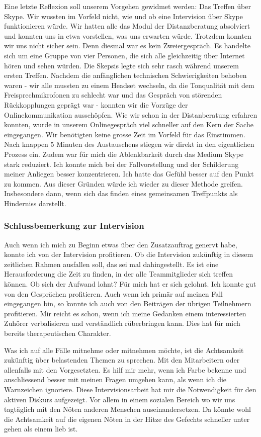 Eine letzte Reflexion soll unserem Vorgehen gewidmet werden: Das Treffen über Skype. Wir wussten im Vorfeld nicht, wie und ob eine Intervision über Skype funktionieren würde. Wir hatten alle das Modul der Distanzberatung absolviert und konnten uns in etwa vorstellen, was uns erwarten würde. Trotzdem konnten wir uns nicht sicher sein. Denn diesmal war es kein Zweiergespräch. Es handelte sich um eine Gruppe von vier Personen, die sich alle gleichzeitig über Internet hören und sehen würden. Die Skepsis legte sich sehr rasch während unserem ersten Treffen. Nachdem die anfänglichen technischen Schwierigkeiten behoben waren - wir alle mussten zu einem Headset wechseln, da die Tonqualität mit dem Freisprechmikrofonen zu schlecht war und das Gespräch von störenden Rückkopplungen geprägt war - konnten wir die Vorzüge der Onlinekommunikation ausschöpfen. Wie wir schon in der Distanberatung erfahren konnten, wurde in unserem Onlinegespräch viel schneller auf den Kern der Sache eingegangen. Wir benötigten keine grosse Zeit im Vorfeld für das Einstimmen. Nach knappen 5 Minuten des Austauschens stiegen wir direkt in den eigentlichen Prozess ein. Zudem war für mich die Ablenkbarkeit durch das Medium Skype stark reduziert. Ich konnte mich bei der Fallvorstellung und der Schilderung meiner Anliegen besser konzentrieren. Ich hatte das Gefühl besser auf den Punkt zu kommen. Aus dieser Gründen würde ich wieder zu dieser Methode greifen. Insbesondere dann, wenn sich das finden eines gemeinsamen Treffpunkts als Hinderniss darstellt. 

\subsubsection{Schlussbemerkung zur Intervision}
Auch wenn ich mich zu Beginn etwas über den Zusatzauftrag genervt habe, konnte ich von der Intervision profitieren. Ob die Intervision zukünftig in diesem zeitlichen Rahmen ausfallen soll, das sei mal dahingestellt. Es ist eine Herausforderung die Zeit zu finden, in der alle Teammitglieder sich treffen können. Ob sich der Aufwand lohnt? Für mich hat er sich gelohnt. Ich konnte gut von den Gesprächen profitieren. Auch wenn ich primär auf meinen Fall eingegangen bin, so konnte ich auch von den Beiträgen der übrigen Teilnehmern profitieren. Mir reicht es schon, wenn ich meine Gedanken einem interessierten Zuhörer verbalisieren und verständlich rüberbringen kann. Dies hat für mich bereits therapeutischen Charakter.

Was ich auf alle Fälle mitnehme oder mitnehmen möchte, ist die Achtsamkeit zukünftig über belastenden Themen zu sprechen. Mit den Mitarbeitern oder allenfalls mit den Vorgesetzten. Es hilf mir mehr, wenn ich Farbe bekenne und anschliessend besser mit meinen Fragen umgehen kann, als wenn ich die Warnzeichen ignoriere. Diese Intervisionsarbeit hat mir die Notwendigkeit für den aktiven Diskurs aufgezeigt. Vor allem in einem sozialen Bereich wo wir uns tagtäglich mit den Nöten anderen Menschen auseinandersetzen. Da könnte wohl die Achtsamkeit auf die eigenen Nöten in der Hitze des Gefechts schneller unter gehen als einem lieb ist.
